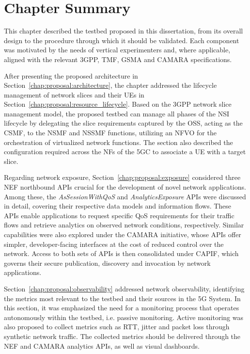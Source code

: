 \section{Chapter Summary}
\label{chap:proposal:summary}

This chapter described the testbed proposed in this dissertation, from its overall design to the procedure through which it should be validated. Each component was motivated by the needs of vertical experimenters and, where applicable, aligned with the relevant \acs{3GPP}, \acs{TMF}, \acs{GSMA} and CAMARA specifications.

After presenting the proposed architecture in Section~\ref{chap:proposal:architecture}, the chapter addressed the lifecycle management of network slices and their \acsp{UE} in Section~\ref{chap:proposal:resource_lifecycle}. Based on the \acs{3GPP} network slice management model, the proposed testbed can manage all phases of the \acs{NSI} lifecycle by delegating the slice requirements captured by the \acs{OSS}, acting as the \acs{CSMF}, to the \acs{NSMF} and \acs{NSSMF} functions, utilizing an \acs{NFVO} for the orchestration of virtualized network functions. The section also described the configuration required across the \acsp{NF} of the \acs{5GC} to associate a \acs{UE} with a target slice.

Regarding network exposure, Section~\ref{chap:proposal:exposure} considered three \acs{NEF} northbound \acsp{API} crucial for the development of novel network applications. Among these, the \textit{AsSessionWithQoS} and \textit{AnalyticsExposure} \acsp{API} were discussed in detail, covering their respective data models and information flows. These \acsp{API} enable applications to request specific \acs{QoS} requirements for their traffic flows and retrieve analytics on observed network conditions, respectively. Similar capabilities were also explored under the CAMARA initiative, whose \acsp{API} offer simpler, developer-facing interfaces at the cost of reduced control over the network. Access to both sets of \acsp{API} is then consolidated under \acs{CAPIF}, which governs their secure publication, discovery and invocation by network applications.

Section~\ref{chap:proposal:observability} addressed network observability, identifying the metrics most relevant to the testbed and their sources in the \acs{5G} System. In this section, it was emphasized the need for a monitoring process that operates autonomously within the testbed, i.e. passive monitoring. Active monitoring was also proposed to collect metrics such as \acs{RTT}, jitter and packet loss through synthetic network traffic. The collected metrics should be delivered through the \acs{NEF} and CAMARA analytics \acsp{API}, as well as visual dashboards.

